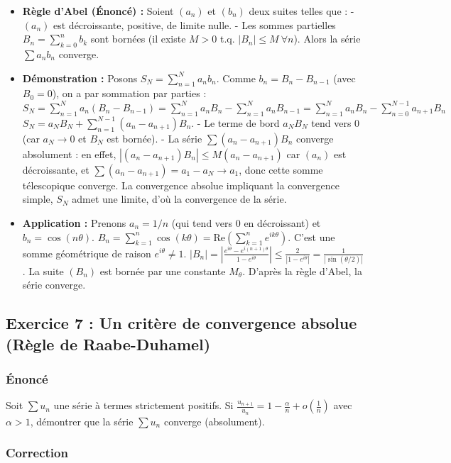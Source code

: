 \documentclass[12pt,a4paper]{report}
\begin{document}
\begin{itemize}
\item \textbf{Règle d'Abel (Énoncé) :} Soient $(a_n)$ et $(b_n)$ deux suites telles que :
   - $(a_n)$ est décroissante, positive, de limite nulle.
   - Les sommes partielles $B_n = \sum_{k=0}^n b_k$ sont bornées (il existe $M > 0$ t.q. $|B_n| \le M \ \forall n$).
   Alors la série $\sum a_n b_n$ converge.
\item \textbf{Démonstration :} Posons $S_N = \sum_{n=1}^N a_n b_n$. Comme $b_n = B_n - B_{n-1}$ (avec $B_0=0$), on a par sommation par parties :
   $S_N = \sum_{n=1}^N a_n (B_n - B_{n-1}) = \sum_{n=1}^N a_n B_n - \sum_{n=1}^N a_n B_{n-1} = \sum_{n=1}^N a_n B_n - \sum_{n=0}^{N-1} a_{n+1} B_n$
   $S_N = a_N B_N + \sum_{n=1}^{N-1} (a_n - a_{n+1}) B_n$.
   - Le terme de bord $a_N B_N$ tend vers 0 (car $a_N \to 0$ et $B_N$ est bornée).
   - La série $\sum (a_n - a_{n+1}) B_n$ converge absolument : en effet, $|(a_n - a_{n+1}) B_n| \le M(a_n - a_{n+1})$ car $(a_n)$ est décroissante, et $\sum (a_n - a_{n+1}) = a_1 - a_N \to a_1$, donc cette somme télescopique converge.
   La convergence absolue impliquant la convergence simple, $S_N$ admet une limite, d'où la convergence de la série.
\item \textbf{Application :} Prenons $a_n = 1/n$ (qui tend vers 0 en décroissant) et $b_n = \cos(n\theta)$.
   $B_n = \sum_{k=1}^n \cos(k\theta) = \text{Re}(\sum_{k=1}^n e^{ik\theta})$. C'est une somme géométrique de raison $e^{i\theta} \neq 1$.
   $|B_n| = |\frac{e^{i\theta} - e^{i(n+1)\theta}}{1 - e^{i\theta}}| \le \frac{2}{|1 - e^{i\theta}|} = \frac{1}{|\sin(\theta/2)|}$.
   La suite $(B_n)$ est bornée par une constante $M_\theta$. D'après la règle d'Abel, la série converge.
\end{itemize}


\subsection{Exercice 7 : Un critère de convergence absolue (Règle de Raabe-Duhamel)}

\subsubsection{Énoncé}
Soit $\sum u_n$ une série à termes strictement positifs. Si $\frac{u_{n+1}}{u_n} = 1 - \frac{\alpha}{n} + o(\frac{1}{n})$ avec $\alpha > 1$, démontrer que la série $\sum u_n$ converge (absolument).

\subsubsection{Correction}
\end{document}
